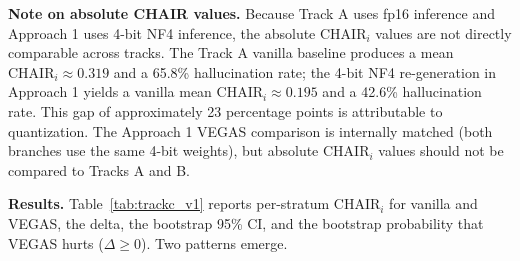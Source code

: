 \documentclass[11pt]{article}
\begin{document}
\textbf{Note on absolute CHAIR values.} Because Track A uses fp16 inference and
Approach 1 uses 4-bit NF4 inference, the absolute $\mathrm{CHAIR}_i$ values are not
directly comparable across tracks. The Track A vanilla baseline produces a mean
$\mathrm{CHAIR}_i \approx 0.319$ and a 65.8\% hallucination rate; the 4-bit NF4
re-generation in Approach 1 yields a vanilla mean $\mathrm{CHAIR}_i \approx 0.195$ and
a 42.6\% hallucination rate. This gap of approximately 23 percentage points is
attributable to quantization. The Approach 1 VEGAS comparison is internally matched
(both branches use the same 4-bit weights), but absolute $\mathrm{CHAIR}_i$ values
should not be compared to Tracks A and B.

\textbf{Results.} Table~\ref{tab:trackc_v1} reports per-stratum $\mathrm{CHAIR}_i$ for
vanilla and VEGAS, the delta, the bootstrap 95\% CI, and the bootstrap probability that
VEGAS hurts ($\Delta \geq 0$). Two patterns emerge.

\begin{table}[!ht]
\centering
\caption{Approach 1 (4-bit NF4, entropy-stratified). VEGAS minus vanilla, per
         stratum. Negative $\Delta$ means VEGAS reduces hallucination.}
\label{tab:trackc_v1}
\end{table}
\end{document}
